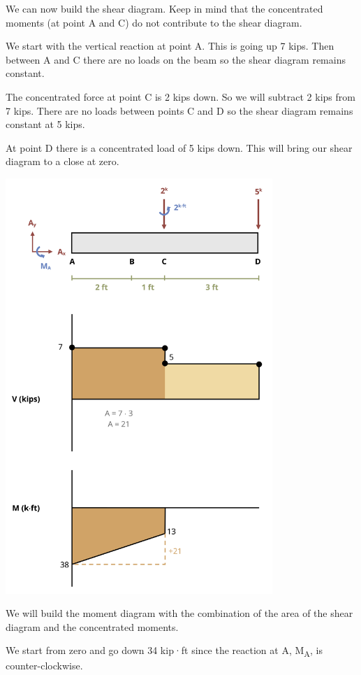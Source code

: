 \documentclass[
  letterpaper,
  DIV=11,
  numbers=noendperiod]{scrreprt}
\begin{document}
\begin{tcolorbox}
\begin{tcolorbox}
We can now build the shear diagram. Keep in mind that the concentrated
moments (at point A and C) do not contribute to the shear diagram.

We start with the vertical reaction at point A. This is going up 7 kips.
Then between A and C there are no loads on the beam so the shear diagram
remains constant.

The concentrated force at point C is 2 kips down. So we will subtract 2
kips from 7 kips. There are no loads between points C and D so the shear
diagram remains constant at 5 kips.

At point D there is a concentrated load of 5 kips down. This will bring
our shear diagram to a close at zero.

\begin{center}
\includegraphics[width=3.97917in,height=\textheight]{images/CH7 PNGs/example 7.4 part 4.png}
\end{center}

We will build the moment diagram with the combination of the area of the
shear diagram and the concentrated moments.

We start from zero and go down 34 kip·ft since the reaction at A,
M\textsubscript{A}, is counter-clockwise.


\end{tcolorbox}
\end{tcolorbox}
\end{document}

